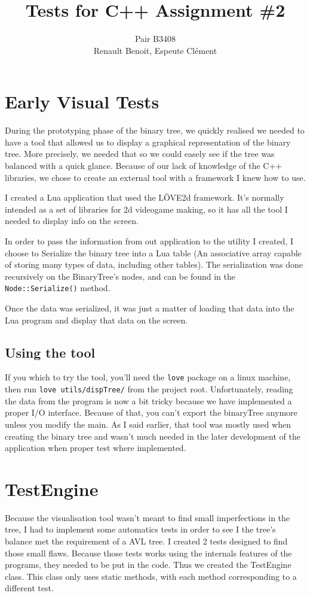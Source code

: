 \documentclass[10pt]{article}
\title{Tests for C++ Assignment \#2}
\author{Pair B3408 \\ {\sc Renault} Benoit, {\sc Espeute} Clément}
\date{}
\begin{document}
\pagestyle{fancy}
\maketitle

\section{Early Visual Tests}
During the prototyping phase of the binary tree, we quickly realised we needed to have a tool that allowed us to display a graphical representation of the binary tree. More precisely, we needed that so we could easely see if the tree was balanced with a quick glance. Because of our lack of knowledge of the C++ libraries, we chose to create an external tool with a framework I knew how to use.

I created a Lua application that used the LÖVE2d framework. It's normally intended as a set of libraries for 2d videogame making, so it has all the tool I needed to display info on the screen.

In order to pass the information from out application to the utility I created, I choose to Serialize the binary tree into a Lua table (An associative array capable of storing many types of data, including other tables). The serialization was done recursively on the BinaryTree's nodes, and can be found in the \texttt{Node::Serialize()} method.

Once the data was serialized, it was just a matter of loading that data into the Lua program and display that data on the screen.

\subsection*{Using the tool}
If you which to try the tool, you'll need the \texttt{love} package on a linux machine, then run \texttt{love~utils/dispTree/} from the project root. Unfortunately, reading the data from the program is now a bit tricky because we have implemented a proper I/O interface. Because of that, you can't export the
binaryTree anymore unless you modify the main. As I said earlier, that tool was mostly used when creating the binary tree and wasn't much needed in the later development of the application when proper test where implemented.

\section{TestEngine}
Because the visualisation tool wasn't meant to find small imperfections in the tree, I had to implement some automatics tests in order to see I the tree's balance met the requirement of a AVL tree. I created 2 tests designed to find those small flaws. Because those tests works using the internals features of the programs, they needed to be put in the code. Thus we created the TestEngine class. This class only uses static methods, with each method corresponding to a different test.
\end{document}
